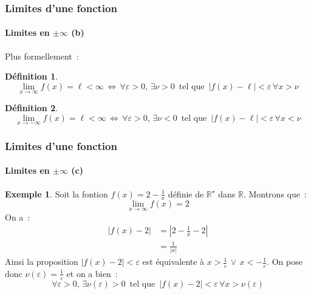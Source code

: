 \documentclass[10pt,notheorems]{beamer}
\theoremstyle{plain}
\theoremstyle{definition} %
\newtheorem{definition}{Définition}
\newtheorem{example}{Exemple}
\begin{document}
\begin{frame}
  \frametitle{Limites d'une fonction}
  \framesubtitle{Limites en $\pm\infty$ (b)}

  Plus formellement~:

  \bigskip

  \addtocounter{definition}{-2}
  \begin{definition}
    \[
      \lim_{x\rightarrow\infty} f(x) = \ell<\infty\,\Leftrightarrow\, \forall\varepsilon>0,\, \exists \nu>0\,\text{ tel que }\, |f(x)-\ell|<\varepsilon\, \forall x>\nu
    \]
  \end{definition}

  \bigskip

  \begin{definition}
    \[
      \lim_{x\rightarrow -\infty} f(x) = \ell<\infty\,\Leftrightarrow\, \forall\varepsilon>0,\, \exists \nu<0\,\text{ tel que }\, |f(x)-\ell|<\varepsilon\, \forall x<\nu
    \]
  \end{definition}

\end{frame}


\begin{frame}
  \frametitle{Limites d'une fonction}
  \framesubtitle{Limites en $\pm\infty$ (c)}

  \begin{example}
    Soit la fontion $f(x) = 2-\frac{1}{x}$ définie de $\mathbb R^{\star}$ dans $\mathbb R$. Montrons que~:
    \[
      \lim_{x\rightarrow\infty}f(x) = 2
    \]
    On a~:
    \[
      \begin{split}
        |f(x)-2| &= \left|2-\frac{1}{x}-2\right|\\
        &= \frac{1}{|x|}
      \end{split}
    \]
    Ainsi la proposition $|f(x)-2|<\varepsilon$ est équivalente à $x>\frac{1}{\varepsilon}\,\lor\, x<-\frac{1}{\varepsilon}$. On pose donc $\nu(\varepsilon) = \frac{1}{\varepsilon}$ et on a bien~:
    \[
      \forall\varepsilon>0,\, \exists \nu(\varepsilon)>0\,\text{ tel que }\, |f(x)-2|<\varepsilon\, \forall x>\nu(\varepsilon)
    \]
  \end{example}

\end{frame}
\end{document}
